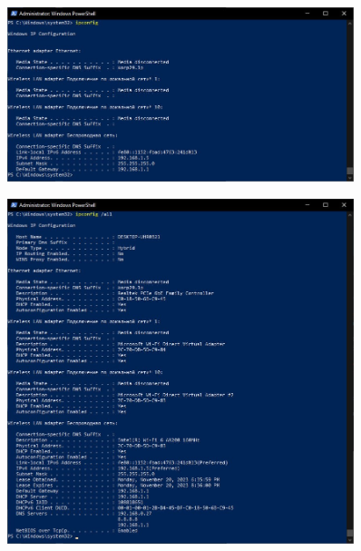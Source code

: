 \documentclass[12pt]{extarticle}
\begin{document}
\begin{figure}[H]
    \centering
    \includegraphics[width=0.90\textwidth]{ipconfig.jpg}
    \caption{}
\end{figure}

\begin{figure}[H]
    \centering
    \includegraphics[width=0.90\textwidth]{all.jpg}
    \caption{}
\end{figure}
\end{document}
